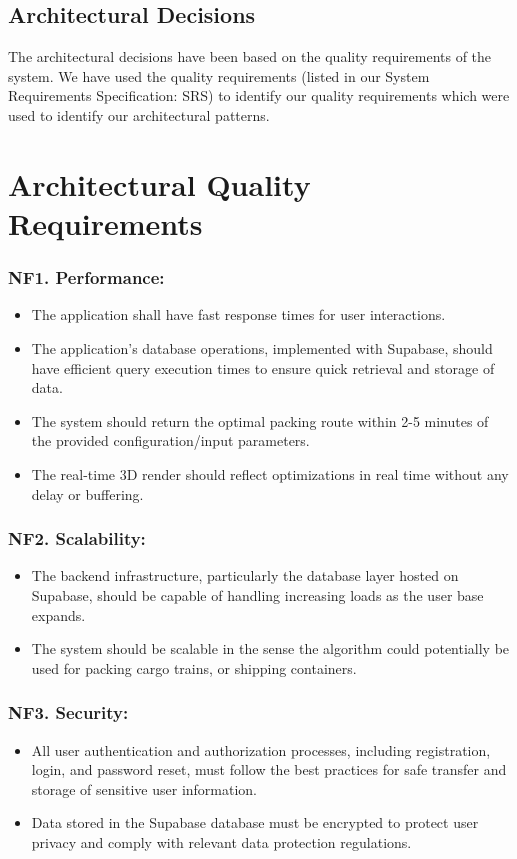 \documentclass[a4paper,12pt]{article}
\begin{document}
\subsection{Architectural Decisions}
The architectural decisions have been based on the quality requirements of the system. We have used the quality requirements (listed in our System Requirements Specification: SRS) to identify our quality requirements which were used to identify our architectural patterns.

\section{Architectural Quality Requirements}
\subsubsection*{NF1. Performance:}
\begin{itemize}
    \item The application shall have fast response times for user interactions.
    \item The application's database operations, implemented with Supabase, should have efficient query execution times to ensure quick retrieval and storage of data.
    \item The system should return the optimal packing route within 2-5 minutes of the provided configuration/input parameters.
    \item The real-time 3D render should reflect optimizations in real time without any delay or buffering.
\end{itemize}

\subsubsection*{NF2. Scalability:}
\begin{itemize}
    \item The backend infrastructure, particularly the database layer hosted on Supabase, should be capable of handling increasing loads as the user base expands.
    \item The system should be scalable in the sense the algorithm could potentially be used for packing cargo trains, or shipping containers.
\end{itemize}

\subsubsection*{NF3. Security:}
\begin{itemize}
    \item All user authentication and authorization processes, including registration, login, and password reset, must follow the best practices for safe transfer and storage of sensitive user information.
    \item Data stored in the Supabase database must be encrypted to protect user privacy and comply with relevant data protection regulations.
\end{itemize}
\end{document}
